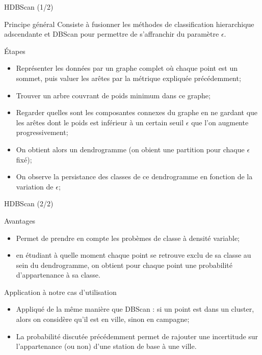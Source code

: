 \begin{frame}{HDBScan (1/2)}
    \begin{block}{Principe général}
        Consiste à fusionner les méthodes de classification hierarchique adscendante et DBScan pour permettre de s'affranchir du paramètre $\epsilon$.
    \end{block}

    \begin{block}{Étapes}
        \begin{itemize}
            \item Représenter les données par un graphe complet où chaque point est un sommet, puis valuer les arêtes par la métrique expliquée précédemment;
            \item Trouver un arbre couvrant de poids minimum dans ce graphe;
            \item Regarder quelles sont les composantes connexes du graphe en ne gardant que les arêtes dont le poids est inférieur à un certain seuil $\epsilon$ que l'on augmente progressivement;
            \item On obtient alors un dendrogramme (on obient une partition pour chaque $\epsilon$ fixé);
            \item On observe la persistance des classes de ce dendrogramme en fonction de la variation de $\epsilon$;
        \end{itemize}
    \end{block}

\end{frame}

\begin{frame}{HDBScan (2/2)}
    \begin{block}{Avantages}
        \begin{itemize}
            \item Permet de prendre en compte les probèmes de classe à densité variable;
            \item en étudiant à quelle moment chaque point se retrouve exclu de sa classe au sein du dendrogramme, on obtient pour chaque point une probabilité d'appartenance à sa classe.
        \end{itemize}
    \end{block}

    \begin{block}{Application à notre cas d'utilisation}
        \begin{itemize}
            \item Appliqué de la même manière que DBScan : si un point est dans un cluster, alors on considère qu'il est en ville, sinon en campagne;
            \item La probabilité discutée précédemment permet de rajouter une incertitude sur l'appartenance (ou non) d'une station de base à une ville.
        \end{itemize}
    \end{block}
\end{frame}

